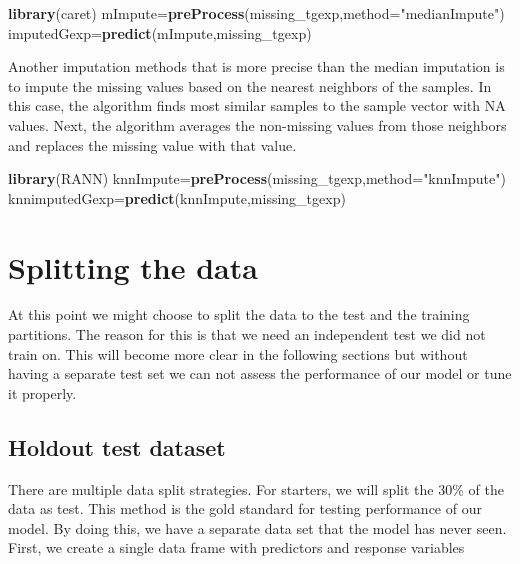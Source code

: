 \documentclass[12pt,]{krantz}
\newenvironment{Shaded}{\begin{snugshade}}{\end{snugshade}}
\newcommand{\DataTypeTok}[1]{\textcolor[rgb]{0.13,0.29,0.53}{#1}}
\newcommand{\KeywordTok}[1]{\textcolor[rgb]{0.13,0.29,0.53}{\textbf{#1}}}
\newcommand{\NormalTok}[1]{#1}
\newcommand{\StringTok}[1]{\textcolor[rgb]{0.31,0.60,0.02}{#1}}
\begin{document}
\begin{Shaded}
\begin{Highlighting}[]
\KeywordTok{library}\NormalTok{(caret)}
\NormalTok{mImpute=}\KeywordTok{preProcess}\NormalTok{(missing_tgexp,}\DataTypeTok{method=}\StringTok{"medianImpute"}\NormalTok{)}
\NormalTok{imputedGexp=}\KeywordTok{predict}\NormalTok{(mImpute,missing_tgexp)}
\end{Highlighting}
\end{Shaded}

Another imputation methods that is more precise than the median imputation is to impute the missing values based on the nearest neighbors of the samples. In this case, the algorithm finds most similar samples to the sample vector with NA values. Next, the algorithm averages the non-missing values from those neighbors and replaces the missing value with that value.

\begin{Shaded}
\begin{Highlighting}[]
\KeywordTok{library}\NormalTok{(RANN)}
\NormalTok{knnImpute=}\KeywordTok{preProcess}\NormalTok{(missing_tgexp,}\DataTypeTok{method=}\StringTok{"knnImpute"}\NormalTok{)}
\NormalTok{knnimputedGexp=}\KeywordTok{predict}\NormalTok{(knnImpute,missing_tgexp) }
\end{Highlighting}
\end{Shaded}

\hypertarget{splitting-the-data}{%
\section{Splitting the data}\label{splitting-the-data}}

At this point we might choose to split the data to the test and the training partitions. The reason for this is that we need an independent test we did not train on. This will become more clear in the following sections but without having a separate test set we can not assess the performance of our model or tune it properly.

\hypertarget{holdout-test-dataset}{%
\subsection{Holdout test dataset}\label{holdout-test-dataset}}

There are multiple data split strategies. For starters, we will split the 30\% of the data as test. This method is the gold standard for testing performance of our model. By doing this, we have a separate data set that the model has never seen. First, we create a single data frame with predictors and response variables
\end{document}
